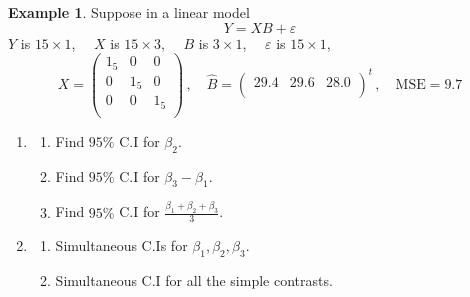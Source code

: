 \documentclass[11pt,a4paper]{article}
\theoremstyle{definition}
\newtheorem{exa}[thm]{Example}
\begin{document}
\begin{exa}\label{res:exa:2.3.4}
Suppose in  a linear model $$Y=XB+\varepsilon$$ $Y$ is $15\times 1$, $\quad  X$ is $15\times 3$, $\quad  B$ is $3\times 1$, $\quad \varepsilon$ is $15\times 1$,
$$X=
\begin{pmatrix}
1_5 & 0 & 0\\
0 & 1_5 & 0\\
0 & 0 & 1_5\\
\end{pmatrix}
\,,\quad  \widehat{B}=
\begin{pmatrix}
29.4 & 29.6 & 28.0\\
\end{pmatrix}^t
\,, \quad  \text{MSE} = 9.7$$

\begin{enumerate}
\item
\begin{enumerate}
       \item Find $95\%$ C.I for $\beta_2$.
       \item Find $95\%$ C.I for $\beta_3-\beta_1$.
       \item Find $95\%$ C.I for $\frac{\beta_1+\beta_2+\beta_3}{3}$.
\end{enumerate}

\item
\begin{enumerate}
     \item Simultaneous C.Is for $\beta_1,\beta_2,\beta_3$.
     \item Simultaneous C.I for all the simple contrasts.\\
\end{enumerate}
\end{enumerate}
\end{exa}
\end{document}
